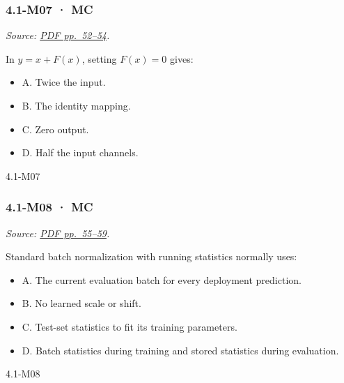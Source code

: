 \noindent\begin{minipage}{\linewidth}

\subsubsection{4.1-M07 · MC}\label{m07-mc-11}

\emph{Source: \href{../Lecture\%20Slides/4.1.\%20CNNs.pdf\#page=52}{PDF
pp.~52--54}.}

In \(y=x+F(x)\), setting \(F(x)=0\) gives:

\begin{itemize}
\tightlist
\item
  A. Twice the input.
\item
  B. The identity mapping.
\item
  C. Zero output.
\item
  D. Half the input channels.
\end{itemize}

\begin{solution}[8mm]{4.1-M07}

\end{solution}
\end{minipage}\par\medskip

\noindent\begin{minipage}{\linewidth}

\subsubsection{4.1-M08 · MC}\label{m08-mc-11}

\emph{Source: \href{../Lecture\%20Slides/4.1.\%20CNNs.pdf\#page=55}{PDF
pp.~55--59}.}

Standard batch normalization with running statistics normally uses:

\begin{itemize}
\tightlist
\item
  A. The current evaluation batch for every deployment prediction.
\item
  B. No learned scale or shift.
\item
  C. Test-set statistics to fit its training parameters.
\item
  D. Batch statistics during training and stored statistics during
  evaluation.
\end{itemize}

\begin{solution}[8mm]{4.1-M08}

\end{solution}
\end{minipage}\par\medskip


